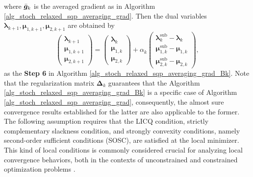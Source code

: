 \documentclass[aos]{imsart}
\numberwithin{equation}{section}
\theoremstyle{plain}
\begin{document}
where $\Bar{\bm{g}}_{k}$ is the averaged gradient as in Algorithm \ref{alg_stoch_relaxed_sqp_averaging_grad}. Then the dual variables $\bm{\lambda}_{k+1}, \bm{\mu}_{1,k+1}, \bm{\mu}_{2,k+1}$ are obtained by
\begin{equation}
    \left( \begin{array}{c}
         \bm{\lambda}_{k+1} \\
         \bm{\mu}_{1,k+1} \\
         \bm{\mu}_{2,k+1}
    \end{array} \right) = \left( \begin{array}{c}
         \bm{\lambda}_{k} \\
         \bm{\mu}_{1,k} \\
         \bm{\mu}_{2,k}
    \end{array} \right) + \alpha_k \left( \begin{array}{c}
         \bm{\lambda}_k^{\text{sub}} - \bm{\lambda}_{k} \\
         \bm{\mu}_{1,k}^{\text{sub}} - \bm{\mu}_{1,k} \\
         \bm{\mu}_{2,k}^{\text{sub}} - \bm{\mu}_{2,k}
    \end{array} \right),
\end{equation}
as the \textbf{Step 6} in Algorithm \ref{alg_stoch_relaxed_sqp_averaging_grad_Bk}.
Note that the regularization matrix $\bm{\Delta}_k$ guarantees that the Algorithm \ref{alg_stoch_relaxed_sqp_averaging_grad_Bk} is a specific case of Algorithm \ref{alg_stoch_relaxed_sqp_averaging_grad}, consequently, the almost sure convergence results established for the latter are also applicable to the former. The following assumption requires that the LICQ condition, strictly complementary slackness condition, and strongly convexity conditions, namely second-order sufficient conditions (SOSC), are satisfied at the local minimizer. This kind of local conditions is commonly considered crucial for analyzing local convergence behaviors, both in the contexts of unconstrained and constrained optimization problems \cite{jorge2006numerical}.
\end{document}
